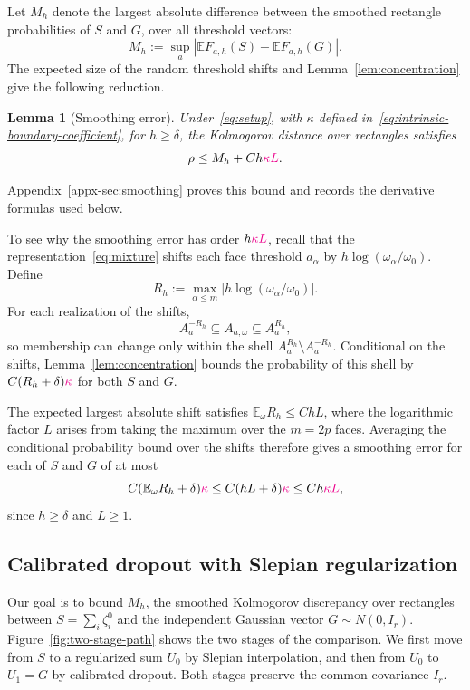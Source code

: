 \documentclass[11pt,letterpaper]{article}
\newcommand{\vSix}[1]{{\color{magenta}#1}}
\newtheorem{lemma}{Lemma}
\theoremstyle{remark}
\newcommand{\E}{\mathbb E}
\begin{document}
{Let \(M_h\) denote the largest absolute difference between the
smoothed rectangle probabilities of \(S\) and \(G\), over all threshold vectors:}
\[
 M_h:=\sup_a|\E F_{a,h}(S)-\E F_{a,h}(G)|.
\]
{The expected size of the random threshold shifts and
Lemma~\ref{lem:concentration} give the following reduction.}
\begin{lemma}[Smoothing error]\label{lem:endpoint}
\vSix{Under~\eqref{eq:setup}, with \(\kappa\) defined in~\eqref{eq:intrinsic-boundary-coefficient}, for \(h\ge\delta\),} the {Kolmogorov distance over rectangles satisfies}
\begin{equation}
 \rho\le M_h+Ch\vSix{\kappa L}.
 \label{eq:endpoint-min}
\end{equation}
\end{lemma}
Appendix~\ref{appx-sec:smoothing} proves this bound and records the
derivative formulas used below. {To see why the smoothing error has
order \(h\vSix{\kappa L}\), recall that the representation~\eqref{eq:mixture}
shifts each face threshold \(a_\alpha\) by
\(h\log(\omega_\alpha/\omega_0)\). {Define}
\[
 R_h:=\max_{\alpha\le m}
 \bigl|h\log(\omega_\alpha/\omega_0)\bigr|.
\]
For each realization of the shifts,
\[
 A_a^{-R_h}\subseteq A_{a,\omega}\subseteq A_a^{R_h},
\]
so membership can change only within the shell
\(A_a^{R_h}\setminus A_a^{-R_h}\). Conditional on the shifts,
Lemma~\ref{lem:concentration} bounds the probability of this shell
by \(C(R_h+\delta)\vSix{\kappa}\) {for both \(S\) and \(G\).}

The expected largest absolute shift satisfies \(\E_\omega R_h\le ChL\),
where the logarithmic factor \(L\) arises from taking the maximum over the
\(m=2p\) faces. Averaging the conditional probability bound over the shifts
therefore gives {a smoothing error for each of \(S\) and \(G\)} of at most
\[
 C(\E_\omega R_h+\delta)\vSix{\kappa}
 \le C(hL+\delta)\vSix{\kappa}
 \le Ch\vSix{\kappa L},
\]
since \(h\ge\delta\) and \(L\ge1\).}


\subsection{Calibrated dropout with Slepian regularization}
\label{sec:outline-path}

{Our goal is to bound \(M_h\), the {smoothed Kolmogorov discrepancy over rectangles} between
\(S=\sum_i\zeta_i^0\) and the independent Gaussian vector \(G\sim N(0,I_r)\).
Figure~\ref{fig:two-stage-path} shows the two stages of the comparison.
We first move from \(S\) to a regularized sum \(U_0\) by Slepian interpolation,
and then from \(U_0\) to \(U_1=G\) by calibrated dropout.
Both stages preserve the common covariance \(I_r\).}
\end{document}
